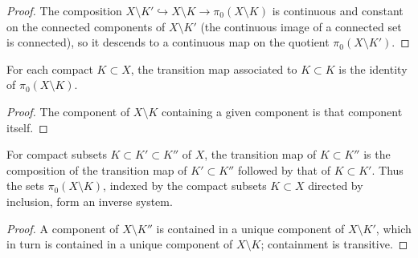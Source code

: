\begin{proof}
\leanok
The composition $X\setminus K'\hookrightarrow X\setminus
K\rightarrow\pi_0(X\setminus K)$ is continuous and constant on the
connected components of $X\setminus K'$ (the continuous image of a
connected set is connected), so it descends to a continuous map on
the quotient $\pi_0(X\setminus K')$.
\end{proof}

\begin{lemma}
\label{lem:ends-transition-id}
\leanok
{}
For each compact $K\subset X$, the transition map associated to
$K\subset K$ is the identity of $\pi_0(X\setminus K)$.
\end{lemma}

\begin{proof}
\leanok
The component of $X\setminus K$ containing a given component is that
component itself.
\end{proof}

\begin{lemma}
\label{lem:ends-transition-comp}
\leanok
{}
For compact subsets $K\subset K'\subset K''$ of $X$, the transition
map of $K\subset K''$ is the composition of the transition map of
$K'\subset K''$ followed by that of $K\subset K'$. Thus the sets
$\pi_0(X\setminus K)$, indexed by the compact subsets $K\subset X$
directed by inclusion, form an inverse system.
\end{lemma}

\begin{proof}
\leanok
A component of $X\setminus K''$ is contained in a unique component
of $X\setminus K'$, which in turn is contained in a unique component
of $X\setminus K$; containment is transitive.
\end{proof}

